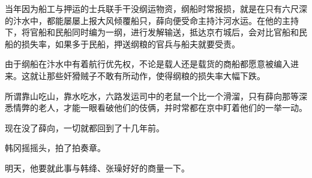 当年因为船工与押运的士兵联手干没纲运物资，纲船时常报损，就是在只有六尺深的汴水中，都能屡屡上报大风倾覆船只，薛向便受命主持汴河水运。在他的主持下，将官船和民船同时编为一纲，进行发解输送，抵达京冇城后，会对比官船和民船的损失率，如果多于民船，押送纲粮的官兵与船夫就要受责。

由于纲船在汴水中有着航行优先权，不论是载人还是载货的商船都愿意被编入进来。这就让那些奸猾贼子不敢有所动作，使得纲粮的损失率大幅下跌。

所谓靠山吃山，靠水吃水，六路发运司中的老鼠一个比一个滑溜，只有薛向那等深悉情弊的老人，才能一眼看破他们的伎俩，并时常都在京中盯着他们的一举一动。

现在没了薛向，一切就都回到了十几年前。

韩冈摇摇头，拍了拍奏章。

明天，他要就此事与韩绛、张璪好好的商量一下。
